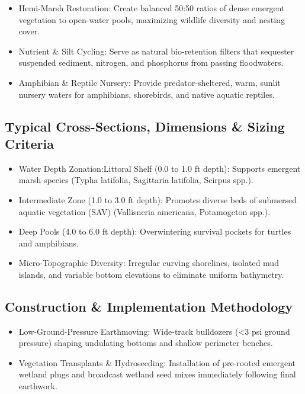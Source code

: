 \documentclass[
  letterpaper,
  DIV=11,
  numbers=noendperiod]{scrreprt}
\begin{document}
\begin{itemize}
\item
  Hemi-Marsh Restoration: Create balanced 50:50 ratios of dense emergent
  vegetation to open-water pools, maximizing wildlife diversity and
  nesting cover.
\item
  Nutrient \& Silt Cycling: Serve as natural bio-retention filters that
  sequester suspended sediment, nitrogen, and phosphorus from passing
  floodwaters.
\item
  Amphibian \& Reptile Nursery: Provide predator-sheltered, warm, sunlit
  nursery waters for amphibians, shorebirds, and native aquatic
  reptiles.
\end{itemize}

\subsection{Typical Cross-Sections, Dimensions \& Sizing
Criteria}\label{typical-cross-sections-dimensions-sizing-criteria-10}

\begin{itemize}
\item
  Water Depth Zonation:Littoral Shelf (0.0 to 1.0 ft depth): Supports
  emergent marsh species (Typha latifolia, Sagittaria latifolia, Scirpus
  spp.).
\item
  Intermediate Zone (1.0 to 3.0 ft depth): Promotes diverse beds of
  submersed aquatic vegetation (SAV) (Vallisneria americana, Potamogeton
  spp.).
\item
  Deep Pools (4.0 to 6.0 ft depth): Overwintering survival pockets for
  turtles and amphibians.
\item
  Micro-Topographic Diversity: Irregular curving shorelines, isolated
  mud islands, and variable bottom elevations to eliminate uniform
  bathymetry.
\end{itemize}

\subsection{Construction \& Implementation
Methodology}\label{construction-implementation-methodology-16}

\begin{itemize}
\item
  Low-Ground-Pressure Earthmoving: Wide-track bulldozers (\textless3 psi
  ground pressure) shaping undulating bottoms and shallow perimeter
  benches.
\item
  Vegetation Transplants \& Hydroseeding: Installation of pre-rooted
  emergent wetland plugs and broadcast wetland seed mixes immediately
  following final earthwork.
\end{itemize}
\end{document}
